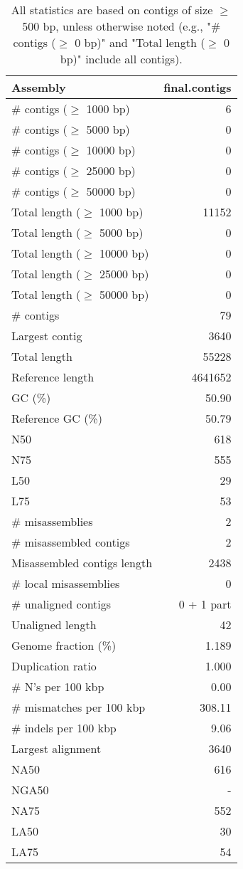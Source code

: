 \documentclass[12pt,a4paper]{article}
\begin{document}
\begin{table}[ht]
\begin{center}
\caption{All statistics are based on contigs of size $\geq$ 500 bp, unless otherwise noted (e.g., "\# contigs ($\geq$ 0 bp)" and "Total length ($\geq$ 0 bp)" include all contigs).}
\begin{tabular}{|l*{1}{|r}|}
\hline
Assembly & final.contigs \\ \hline
\# contigs ($\geq$ 1000 bp) & 6 \\ \hline
\# contigs ($\geq$ 5000 bp) & 0 \\ \hline
\# contigs ($\geq$ 10000 bp) & 0 \\ \hline
\# contigs ($\geq$ 25000 bp) & 0 \\ \hline
\# contigs ($\geq$ 50000 bp) & 0 \\ \hline
Total length ($\geq$ 1000 bp) & 11152 \\ \hline
Total length ($\geq$ 5000 bp) & 0 \\ \hline
Total length ($\geq$ 10000 bp) & 0 \\ \hline
Total length ($\geq$ 25000 bp) & 0 \\ \hline
Total length ($\geq$ 50000 bp) & 0 \\ \hline
\# contigs & 79 \\ \hline
Largest contig & 3640 \\ \hline
Total length & 55228 \\ \hline
Reference length & 4641652 \\ \hline
GC (\%) & 50.90 \\ \hline
Reference GC (\%) & 50.79 \\ \hline
N50 & 618 \\ \hline
N75 & 555 \\ \hline
L50 & 29 \\ \hline
L75 & 53 \\ \hline
\# misassemblies & 2 \\ \hline
\# misassembled contigs & 2 \\ \hline
Misassembled contigs length & 2438 \\ \hline
\# local misassemblies & 0 \\ \hline
\# unaligned contigs & 0 + 1 part \\ \hline
Unaligned length & 42 \\ \hline
Genome fraction (\%) & 1.189 \\ \hline
Duplication ratio & 1.000 \\ \hline
\# N's per 100 kbp & 0.00 \\ \hline
\# mismatches per 100 kbp & 308.11 \\ \hline
\# indels per 100 kbp & 9.06 \\ \hline
Largest alignment & 3640 \\ \hline
NA50 & 616 \\ \hline
NGA50 & - \\ \hline
NA75 & 552 \\ \hline
LA50 & 30 \\ \hline
LA75 & 54 \\ \hline
\end{tabular}
\end{center}
\end{table}
\end{document}
